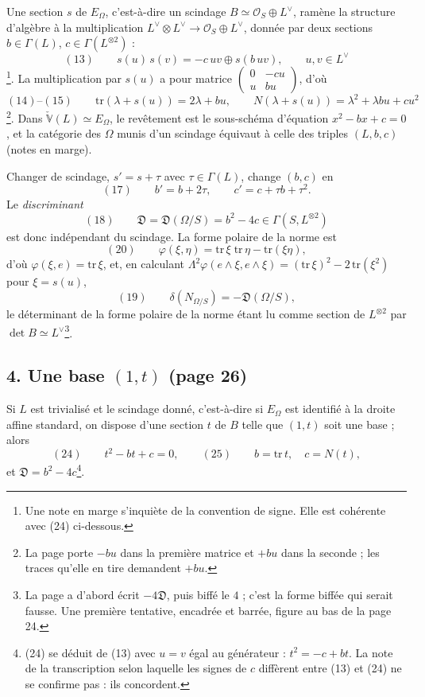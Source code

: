\documentclass[11pt,a4paper]{article}
\begin{document}
Une section $s$ de $E_\Omega$, c'est-à-dire un scindage $B \simeq \mathcal{O}_S \oplus
L^{\vee}$, ramène la structure d'algèbre à la multiplication $L^{\vee} \otimes
L^{\vee} \to \mathcal{O}_S \oplus L^{\vee}$, donnée par deux sections $b \in \Gamma(L)$,
$c \in \Gamma(L^{\otimes 2})$ :
\[
  (13) \qquad s(u)\, s(v) = -c\,uv \oplus s(b\,uv), \qquad u, v \in L^{\vee}
\]
\footnote{Une note en marge s'inquiète de la convention de signe. Elle est
cohérente avec (24) ci-dessous.}. La multiplication par $s(u)$ a pour matrice
$\begin{pmatrix} 0 & -cu \\ u & bu \end{pmatrix}$, d'où
\[
  (14)\text{--}(15) \qquad \mathrm{tr}(\lambda + s(u)) = 2\lambda + bu, \qquad
  N(\lambda + s(u)) = \lambda^2 + \lambda bu + cu^2
\]
\footnote{La page porte $-bu$ dans la première matrice et $+bu$ dans la seconde ;
les traces qu'elle en tire demandent $+bu$.}. Dans $\check{\mathbb{V}}(L) \simeq
E_\Omega$, le revêtement est le sous-schéma d'équation $x^2 - bx + c = 0$, et la
catégorie des $\Omega$ munis d'un scindage équivaut à celle des triples $(L, b,
c)$ (notes en marge).

Changer de scindage, $s' = s + \tau$ avec $\tau \in \Gamma(L)$, change $(b, c)$ en
\[
  (17) \qquad b' = b + 2\tau, \qquad c' = c + \tau b + \tau^2 .
\]
Le \emph{discriminant}
\[
  (18) \qquad \mathfrak{D} = \mathfrak{D}(\Omega/S) = b^2 - 4c \in \Gamma(S,
  L^{\otimes 2})
\]
est donc indépendant du scindage. La forme polaire de la norme est
\[
  (20) \qquad \varphi(\xi, \eta) = \mathrm{tr}\,\xi\;\mathrm{tr}\,\eta -
  \mathrm{tr}(\xi\eta),
\]
d'où $\varphi(\xi, e) = \mathrm{tr}\,\xi$, et, en calculant $\Lambda^2\varphi(e \wedge
\xi, e \wedge \xi) = (\mathrm{tr}\,\xi)^2 - 2\,\mathrm{tr}(\xi^2)$ pour $\xi = s(u)$,
\[
  (19) \qquad \delta(N_{\Omega/S}) = -\mathfrak{D}(\Omega/S),
\]
le déterminant de la forme polaire de la norme étant lu comme section de
$L^{\otimes 2}$ par $\det B \simeq L^{\vee}$\footnote{La page a d'abord écrit
$-4\mathfrak{D}$, puis biffé le $4$ ; c'est la forme biffée qui serait fausse. Une
première tentative, encadrée et barrée, figure au bas de la page 24.}.

\subsection*{4. Une base $(1, t)$ (page 26)}

Si $L$ est trivialisé et le scindage donné, c'est-à-dire si $E_\Omega$ est
identifié à la droite affine standard, on dispose d'une section $t$ de $B$ telle
que $(1, t)$ soit une base ; alors
\[
  (24) \qquad t^2 - bt + c = 0, \qquad (25) \qquad b = \mathrm{tr}\,t, \quad c =
  N(t),
\]
et $\mathfrak{D} = b^2 - 4c$\footnote{(24) se déduit de (13) avec $u = v$ égal au
générateur : $t^2 = -c + bt$. La note de la transcription selon laquelle les
signes de $c$ diffèrent entre (13) et (24) ne se confirme pas : ils
concordent.}.
\end{document}
